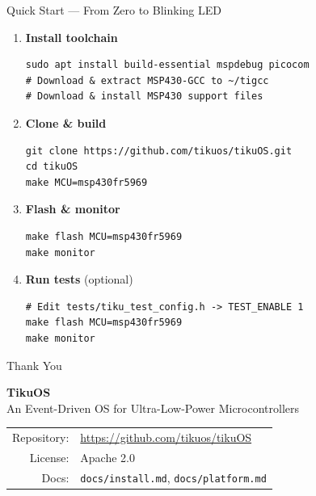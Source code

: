 \documentclass[aspectratio=169, 10pt]{beamer}
\begin{document}
\begin{frame}[fragile]{Quick Start — From Zero to Blinking LED}
\begin{enumerate}
  \item \textbf{Install toolchain}
\begin{lstlisting}[style=bashstyle]
sudo apt install build-essential mspdebug picocom
# Download & extract MSP430-GCC to ~/tigcc
# Download & install MSP430 support files
\end{lstlisting}

  \item \textbf{Clone \& build}
\begin{lstlisting}[style=bashstyle]
git clone https://github.com/tikuos/tikuOS.git
cd tikuOS
make MCU=msp430fr5969
\end{lstlisting}

  \item \textbf{Flash \& monitor}
\begin{lstlisting}[style=bashstyle]
make flash MCU=msp430fr5969
make monitor
\end{lstlisting}

  \item \textbf{Run tests} (optional)
\begin{lstlisting}[style=bashstyle]
# Edit tests/tiku_test_config.h -> TEST_ENABLE 1
make flash MCU=msp430fr5969
make monitor
\end{lstlisting}
\end{enumerate}
\end{frame}

\begin{frame}{Thank You}
\begin{center}
\Large\textbf{TikuOS}\\[0.5em]
\normalsize An Event-Driven OS for Ultra-Low-Power Microcontrollers\\[1.5em]

\begin{tabular}{rl}
  Repository: & \url{https://github.com/tikuos/tikuOS} \\
  License:    & Apache 2.0 \\
  Docs:       & \texttt{docs/install.md}, \texttt{docs/platform.md} \\
\end{tabular}
\end{center}
\end{frame}
\end{document}

